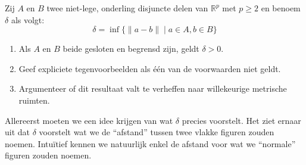 \documentclass[main.tex]{subfiles}
\begin{document}
\begin{st}
  Zij $A$ en $B$ twee niet-lege, onderling disjuncte delen van $\mathbb{R}^{p}$ met $p \ge 2$ en benoem $\delta$ als volgt:
  \[ \delta = \inf \{ \|a-b\| \mid a\in A, b\in B \} \]
  \begin{enumerate}
  \item Als $A$ en $B$ beide gesloten en begrensd zijn, geldt $\delta > 0$.
  \item Geef expliciete tegenvoorbeelden als \'e\'en van de voorwaarden niet geldt.
  \item Argumenteer of dit resultaat valt te verheffen naar willekeurige metrische ruimten.
  \end{enumerate}

  \begin{klad}
    Allereerst moeten we een idee krijgen van wat $\delta$ precies voorstelt.
    Het ziet ernaar uit dat $\delta$ voorstelt wat we de ``afstand'' tussen twee vlakke figuren zouden noemen.
    Intu\"itief kennen we natuurlijk enkel de afstand voor wat we ``normale'' figuren zouden noemen.
  \end{klad}


\end{st}
\end{document}
